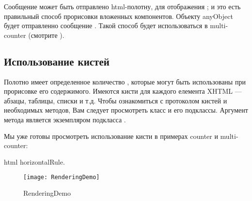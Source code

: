 \documentclass[a4paper,10pt,twoside]{book}
\begin{document}
Сообщение  может быть отправлено html-полотну,
для отображения ;
и это есть правильный способ прорисовки вложенных компонентов.
Объекту anyObject будет отправленно сообщение .
Такой способ будет использоваться в multi-counter (смотрите ).


\subsection{Использование кистей}


Полотно имеет определенное количество ,
которые могут быть использованы при прорисовке его содержимого.
Имеются кисти для каждого елемента XHTML --- абзацы, таблицы, списки и т.д.
Чтобы ознакомиться с  протоколом кистей и необходимых методов,
Вам следует просмотреть класс  и его подклассы.
Аргумент метода 
является экземпляром подкласса .


Мы уже готовы просмотреть использование кисти в примерах counter и multi-counter:
\begin{code}{}
html horizontalRule.
\end{code}

\begin{figure}[ht]
\begin{center}
\texttt{[image: RenderingDemo]}
\caption{RenderingDemo}
\end{center}
\end{figure}
\end{document}
